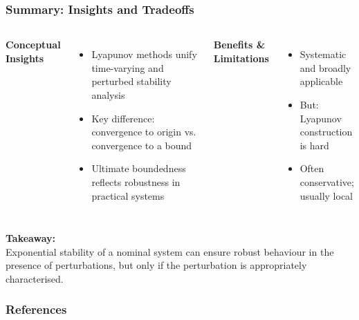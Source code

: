 \documentclass[student, noshadow, lsr, english, aspectratio=169, t]{ITR_LSR_slides}
\begin{document}

\begin{frame}
    \frametitle{Summary: Insights and Tradeoffs}
    \begin{columns}[t]
        \textbf{Conceptual Insights}
        \begin{itemize}
            \item Lyapunov methods unify time-varying and perturbed stability analysis
            \item Key difference: convergence to origin vs. convergence to a bound
            \item Ultimate boundedness reflects robustness in practical systems
        \end{itemize}

        \textbf{Benefits \& Limitations}
        \begin{itemize}
            \item Systematic and broadly applicable
            \item But: Lyapunov construction is hard
            \item Often conservative; usually local
        \end{itemize}
    \end{columns}
    \vspace{1em}
    \textbf{Takeaway:} \\
	Exponential stability of a nominal system can ensure robust behaviour in the presence of perturbations, but only if the perturbation is appropriately characterised.

\end{frame}



\appendix

\begin{frame}[allowframebreaks]
    \frametitle{References}
    \nocite{*} 
    \printbibliography[heading=none]
\end{frame}
\end{document}
